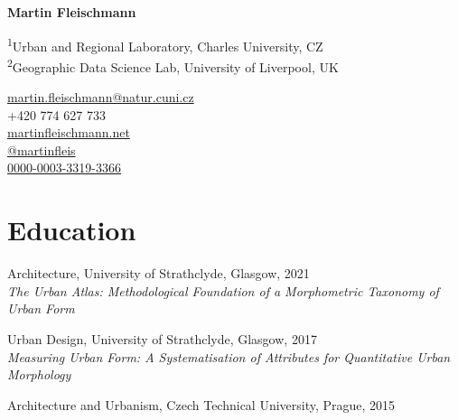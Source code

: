 \documentclass[12pt,a4paper]{report}
\newcommand{\myname}{Martin Fleischmann}
\newcommand{\namefont}[1]{{\normalfont\bfseries\Huge{#1}}}
\begin{document}
    \raggedright{}

    \namefont{\myname}

    \vspace{1em}

    \begin{minipage}[t]{0.6\textwidth}
        \begin{flushleft}
            \textsuperscript{1}Urban and Regional Laboratory, Charles University, CZ \\
            \textsuperscript{2}Geographic Data Science Lab, University of Liverpool, UK \\
        \end{flushleft}
    \end{minipage}%
    \begin{minipage}[t]{0.4\textwidth}
        \begin{flushright}
            \href{mailto:martin.fleischmann@natur.cuni.cz}{martin.fleischmann@natur.cuni.cz} \\
            +420 774 627 733 \\
            \href{https://martinfleischmann.net}{martinfleischmann.net} \\
            \href{https://fosstodon.org/@martinfleis}{@martinfleis} \\
            \href{https://orcid.org/0000-0003-3319-3366}{0000-0003-3319-3366}
        \end{flushright}
    \end{minipage}%


    \section*{Education}

    \begin{tablist}

        \item[Ph.D.] \tab{}Architecture, University of Strathclyde, Glasgow, 2021 \\
                           \textit{The Urban Atlas: Methodological Foundation of a Morphometric Taxonomy of Urban Form}
        \item[MSc.]  \tab{}Urban Design, University of Strathclyde, Glasgow, 2017 \\
                           \textit{Measuring Urban Form: A Systematisation of Attributes for Quantitative Urban Morphology}
        \item[BSc.]  \tab{}Architecture and Urbanism, Czech Technical University, Prague, 2015

    \end{tablist}
\end{document}
